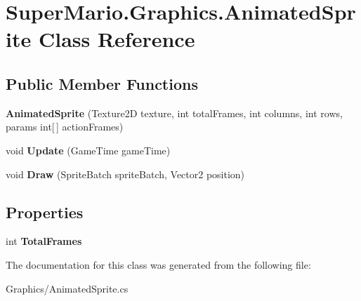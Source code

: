 \hypertarget{class_super_mario_1_1_graphics_1_1_animated_sprite}{}\section{Super\+Mario.\+Graphics.\+Animated\+Sprite Class Reference}
\label{class_super_mario_1_1_graphics_1_1_animated_sprite}
\subsection*{Public Member Functions}
\begin{DoxyCompactItemize}
\item 
\mbox{\label{class_super_mario_1_1_graphics_1_1_animated_sprite_a6458b19f7c9fc171e5fca0b880d2e229}} 
{\bfseries Animated\+Sprite} (Texture2D texture, int total\+Frames, int columns, int rows, params int\mbox{[}$\,$\mbox{]} action\+Frames)
\item 
\mbox{\label{class_super_mario_1_1_graphics_1_1_animated_sprite_aa11f2da4ed82e78a2386ad3d07d262a3}} 
void {\bfseries Update} (Game\+Time game\+Time)
\item 
\mbox{\label{class_super_mario_1_1_graphics_1_1_animated_sprite_ab647c3ee7530a04ad1ac057201e0e8ed}} 
void {\bfseries Draw} (Sprite\+Batch sprite\+Batch, Vector2 position)
\end{DoxyCompactItemize}
\subsection*{Properties}
\begin{DoxyCompactItemize}
\item 
\mbox{\label{class_super_mario_1_1_graphics_1_1_animated_sprite_a5f2a524155622c381ed4ca2a4c9e6fe9}} 
int {\bfseries Total\+Frames}
\end{DoxyCompactItemize}


The documentation for this class was generated from the following file\+:\begin{DoxyCompactItemize}
\item 
Graphics/Animated\+Sprite.\+cs\end{DoxyCompactItemize}
